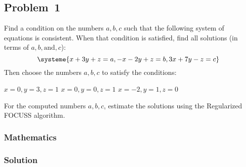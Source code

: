 \subsection{Problem~1}%
\label{problem:1}

Find a condition on the numbers $a, b, c$ such that the following system of equations is consistent.
When that condition is satisfied, find all solutions
(in terms of $a, b, \text{and}, c$):
\begin{equation*}
  \systeme{x+3y+z=a,
  -x-2y+z=b,
  3x+7y-z=c}
\end{equation*}
Then choose the numbers $a, b, c$ to satisfy the conditions:
\begin{tasks}
  \task $x=0, y=3, z=1$
  \task $x=0, y=0, z=1$
  \task $x=-2, y=1, z=0$
\end{tasks}
For the computed numbers $a, b, c$, estimate the solutions using the Regularized FOCUSS algorithm.

\subsubsection*{Mathematics}


\subsubsection*{Solution}

